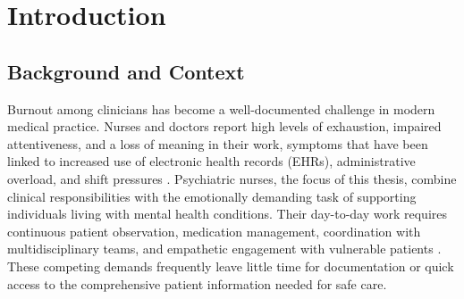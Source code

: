 
\chapter{Introduction}

\ifpdf
    \graphicspath{{Chapter1/Figs/Raster/}{Chapter1/Figs/PDF/}{Chapter1/Figs/}}
\else
    \graphicspath{{Chapter1/Figs/Vector/}{Chapter1/Figs/}}
\fi

\section{Background and Context}
Burnout among clinicians has become a well-documented challenge in modern medical practice. Nurses and doctors report high levels of exhaustion, impaired attentiveness, and a loss of meaning in their work, symptoms that have been linked to increased use of electronic health records (EHRs), administrative overload, and shift pressures \cite{nejm2016burnout, physicianburnout2018, timeallocation2016, burnoutcovid2021}. Psychiatric nurses, the focus of this thesis, combine clinical responsibilities with the emotionally demanding task of supporting individuals living with mental health conditions. Their day-to-day work requires continuous patient observation, medication management, coordination with multidisciplinary teams, and empathetic engagement with vulnerable patients \cite{understandingnursing2019}. These competing demands frequently leave little time for documentation or quick access to the comprehensive patient information needed for safe care.

